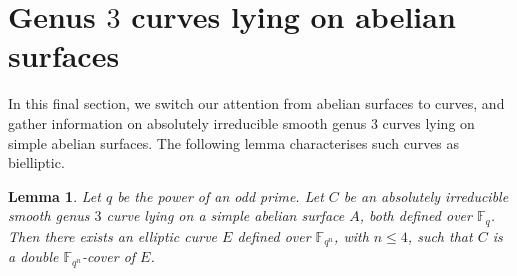 \documentclass[11pt]{amsart}
\newcommand\F{\mathbb{F}}
\newcommand\Fq{\mathbb{F}_q}
\theoremstyle{plain}
\newtheorem{lemma}[theorem]{Lemma}
\theoremstyle{definition}
\begin{document}
\section{Genus \texorpdfstring{$3$}{3} curves lying on abelian surfaces}\label{ses:curveside}
In this final section, we switch our attention from abelian surfaces to curves, and gather information on absolutely irreducible smooth genus $3$ curves lying on simple abelian surfaces. The following lemma characterises such curves as bielliptic.

\begin{lemma}\label{lem:jac}
    Let $q$ be the power of an odd prime. Let $C$ be an absolutely irreducible smooth genus $3$ curve lying on a simple abelian surface $A$, both defined over $\Fq$. Then there exists an elliptic curve $E$ defined over $\F_{q^n}$, with $n\leq 4$, such that $C$ is a double $\F_{q^n}$-cover of $E$.
\end{lemma}
\end{document}
